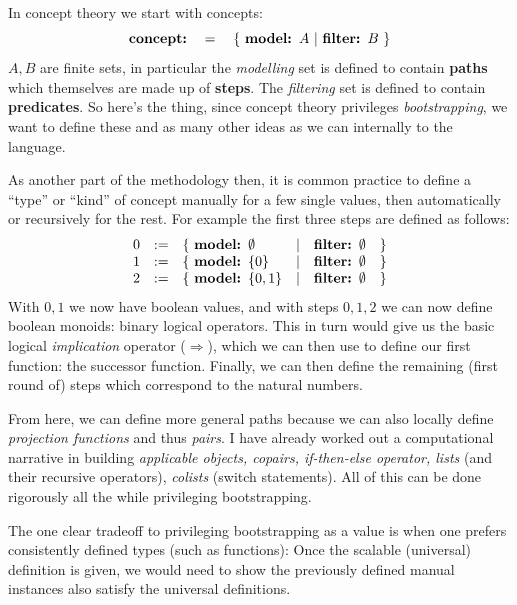 \documentclass[twoside]{article}
\begin{document}
In concept theory we start with concepts:
$$ \mbox{\bfseries concept:} \quad = \quad \{\ \mbox{\bfseries model: } A\ |\ \mbox{\bfseries filter: } B\ \} $$
$ A, B $ are finite sets, in particular the \emph{modelling} set is defined to contain {\bfseries paths} which
themselves are made up of {\bfseries steps}. The \emph{filtering} set is defined to contain {\bfseries predicates}.
So here's the thing, since concept theory privileges \emph{bootstrapping}, we want to define these and as many
other ideas as we can internally to the language.

As another part of the methodology then, it is common practice to define a ``type'' or ``kind'' of concept manually
for a few single values, then automatically or recursively for the rest. For example the first three steps
are defined as follows:
$$ \begin{array}{lcllll}
0 & := & \{\ \mbox{\bfseries model: } \emptyset & | & \mbox{\bfseries filter: } \emptyset & \}	\\
1 & := & \{\ \mbox{\bfseries model: } \{0\} & | & \mbox{\bfseries filter: } \emptyset & \}	\\
2 & := & \{\ \mbox{\bfseries model: } \{0,1\} & | & \mbox{\bfseries filter: } \emptyset & \}	\\
\end{array} $$
With $ 0,1 $ we now have boolean values, and with steps $ 0,1,2 $ we can now define boolean monoids: binary logical
operators. This in turn would give us the basic logical \emph{implication} operator ($ \Rightarrow $), which we can
then use to define our first function: the successor function. Finally, we can then define the remaining (first round
of) steps which correspond to the natural numbers.

From here, we can define more general paths because we can also locally define \emph{projection functions} and thus
\emph{pairs}.  I have already worked out a computational narrative in building \emph{applicable objects, copairs,
if-then-else operator, lists} (and their recursive operators), \emph{colists} (switch statements). All of this can
be done rigorously all the while privileging bootstrapping.

The one clear tradeoff to privileging bootstrapping as a value is when one prefers consistently defined types (such
as functions): Once the scalable (universal) definition is given, we would need to show the previously defined
manual instances also satisfy the universal definitions.

\ \\[0.5cm]
\end{document}
